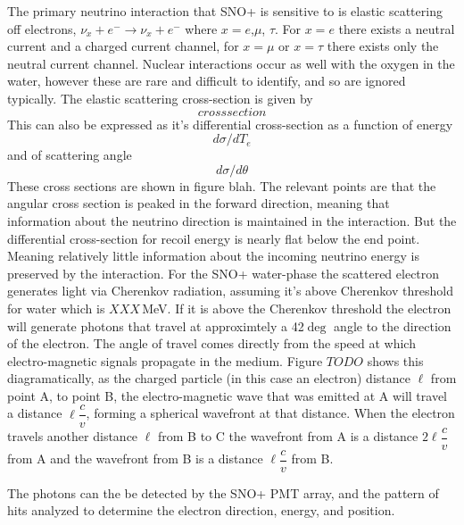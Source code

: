 The primary neutrino interaction that SNO+ is sensitive to is elastic scattering
off electrons,
$\nu_{x} + e^{-} \rightarrow \nu_{x} + e^{-}$
where $x=e$,$\mu$, $\tau$.
For $x=e$ there exists a neutral current and a charged current channel,
for $x=\mu$ or $x=\tau$ there exists only the neutral current channel.
Nuclear interactions occur as well with the oxygen in the water,
however these are rare and difficult to identify, and so are ignored typically.
The elastic scattering cross-section is given by
\begin{equation}
cross section
\end{equation}
This can also be expressed as it's differential cross-section as a function
of energy
\begin{equation}
    d\sigma/dT_{e}
\end{equation}
and of scattering angle
\begin{equation}
d\sigma/d\theta
\end{equation}
These cross sections are shown in figure blah.
The relevant points are that the angular cross section is peaked in
the forward direction, meaning that information about the neutrino direction
is maintained in the interaction.
But the differential cross-section for recoil energy is nearly flat below the
end point. Meaning relatively little information about the incoming neutrino energy
is preserved by the interaction.
For the SNO+ water-phase the scattered electron generates light via Cherenkov radiation,
assuming it's above Cherenkov threshold for water which is $XXX$\,MeV.
If it is above the Cherenkov threshold the electron will generate photons that
travel at approximtely a 42$\deg$ angle to the direction of the electron.
The angle of travel comes directly from the speed at which electro-magnetic
signals propagate in the medium.
Figure $TODO$ shows this diagramatically, as the charged particle (in this case
an electron) distance $\ell$ from point A, to point B, the electro-magnetic wave
that was emitted at A will travel a distance $\ell \dfrac{c}{v}$, forming
a spherical wavefront at that distance.
When the electron travels another distance $\ell$ from B to C the wavefront
from A is a distance $2\ell\dfrac{c}{v}$ from A and the wavefront from B is
a distance $\ell \dfrac{c}{v}$ from B.


The photons can the be detected by the SNO+ PMT array, and the pattern
of hits analyzed to determine the electron direction, energy, and position.

